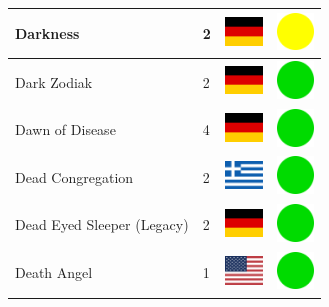 \documentclass[12pt, a4paper, twoside]{report}
\begin{document}
\begin{center}
\begin{longtable}{|p{5cm}|p{2cm}|p{2cm}|p{2cm}|}
			Darkness & 2 & \includegraphics[width=1cm]{4x3/de} & \includegraphics[width=1cm]{likes/m} \\ \hline
			Dark Zodiak & 2 & \includegraphics[width=1cm]{4x3/de} & \includegraphics[width=1cm]{likes/y} \\ \hline
			Dawn of Disease & 4 & \includegraphics[width=1cm]{4x3/de} & \includegraphics[width=1cm]{likes/y} \\ \hline
			Dead Congregation & 2 & \includegraphics[width=1cm]{4x3/gr} & \includegraphics[width=1cm]{likes/y} \\ \hline
			Dead Eyed Sleeper (Legacy) & 2 & \includegraphics[width=1cm]{4x3/de} & \includegraphics[width=1cm]{likes/y} \\ \hline
			Death Angel & 1 & \includegraphics[width=1cm]{4x3/us} & \includegraphics[width=1cm]{likes/y} \\ \hline

\end{longtable}
\end{center}
\end{document}
